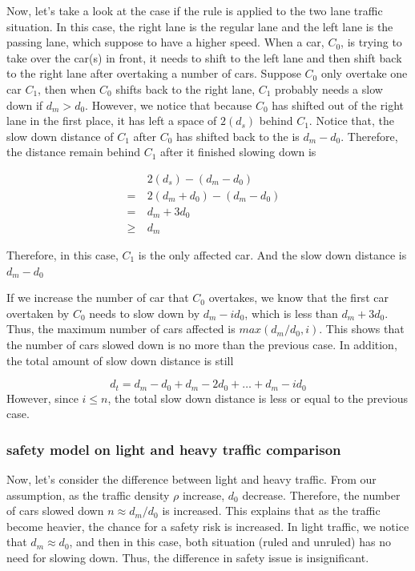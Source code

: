 Now, let's take a look at the case if the rule is applied to the two lane traffic situation. In this case, the right lane is the regular lane and the left lane is the passing lane, which suppose to have a higher speed. When a car, $C_0$, is trying to take over the car(s) in front, it needs to shift to the left lane and then shift back to the right lane after overtaking a number of cars. Suppose $C_0$ only overtake one car $C_1$, then when $C_0$ shifts back to the right lane, $C_1$ probably needs a slow down if $d_m>d_0$. However, we notice that because $C_0$ has shifted out of the right lane in the first place, it has left a space of $2(d_s)$ behind $C_1$. Notice that, the slow down distance of $C_1$ after $C_0$ has shifted back to the is $d_m-d_0$. Therefore, the distance remain behind $C_1$ after it finished slowing down is

\begin{align}
&2(d_s)-(d_m-d_0)&\\
=\ &2(d_m+d_0)-(d_m-d_0)&\\
=\ &d_m+3d_0&\\
\ge \ &d_m&
\end{align}

Therefore, in this case, $C_1$ is the only affected car. And the slow down distance is $d_m-d_0$

If we increase the number of car that $C_0$ overtakes, we know that the first car overtaken by $C_0$ needs to slow down by $d_m-id_0$, which is less than $d_m+3d_0$. Thus, the maximum number of cars affected is $max(d_m/d_0, i)$. This shows that the number of cars slowed down is no more than the previous case. In addition, the total amount of slow down distance is still

\begin{equation}
d_t = d_m-d_0 + d_m-2d_0 + \dots + d_m - id_0 
\end{equation}
However, since $i\le n$, the total slow down distance is less or equal to the previous case. 


\subsubsection{safety model on light and heavy traffic comparison}

Now, let's consider the difference between light and heavy traffic. From our assumption, as the traffic density $\rho$ increase, $d_0$ decrease. Therefore, the number of cars slowed down $n\approx d_m/d_0$ is increased. This explains that as the traffic become heavier, the chance for a safety risk is increased. In light traffic, we notice that $d_m \approx d_0$, and then in this case, both situation (ruled and unruled) has no need for slowing down. Thus, the difference in safety issue is insignificant. 



